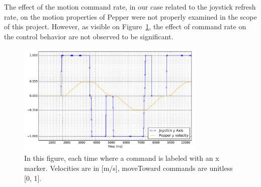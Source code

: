 \documentclass[11pt,a4paper]{article}
\begin{document}
The effect of the motion command rate, in our case related to the joystick refresh rate, on the motion properties of Pepper were not properly examined in the scope of this project. However, as visible on Figure~\ref{fig:joystick_rate}, the effect of command rate on the control behavior are not observed to be significant.

\begin{figure}[h]
\centering
{}
\includegraphics[width=0.8\textwidth]{figures/variable_joystick_rate.pdf}
\caption{In this figure, each time where a command is labeled with an x marker. Velocities are in [m/s], moveToward commands are unitless [0, 1].} 
\label{fig:joystick_rate}
\end{figure}
\end{document}
